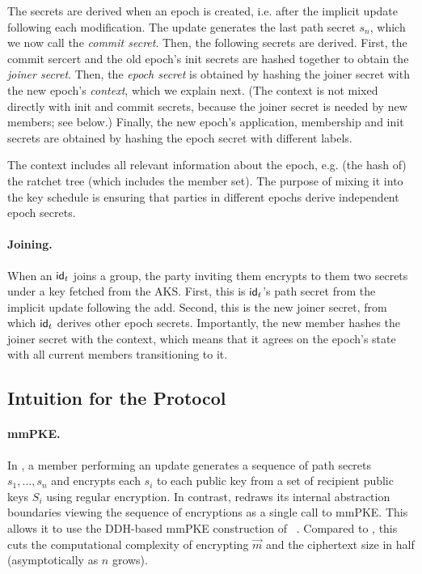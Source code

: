 The secrets are derived when an epoch is created, i.e. after the implicit update following each modification. The update
generates the last path secret $s_n$, which we now call the \emph{commit secret}. Then, the following secrets are
derived. First, the commit sercert and the old epoch's init secrets are hashed together to obtain the \emph{joiner
  secret}. Then, the \emph{epoch secret} is obtained by hashing the joiner secret with the new epoch's \emph{context}, which we explain next. (The context is not mixed directly with init and commit secrets, because the joiner secret is needed by new members; see below.) Finally, the new epoch's application, membership and init secrets are obtained by hashing the epoch secret with different labels.

The context includes all relevant information about the epoch, e.g. (the hash of) the ratchet tree (which includes the member set). The purpose of mixing it into the key schedule is ensuring that parties in different epochs derive independent epoch secrets.

\paragraph{Joining.}
When an ${\mathsf{id}}_t$ joins a group, the party inviting them encrypts to them two secrets under a key fetched from the AKS. First, this is ${\mathsf{id}}_t$'s path secret from the implicit update following the add. Second, this is the new joiner secret, from which ${\mathsf{id}}_t$ derives other epoch secrets.
Importantly, the new member hashes the joiner secret with the context, which means that it agrees on the epoch's state with all current members transitioning to it.

\subsection{Intuition for the \saik Protocol}\label{sec:intuition2}
\paragraph{mmPKE.}
In \protITK, a member performing an update generates a sequence of path secrets $s_1, \dots, s_n$ and encrypts each $s_i$ to each public key from a set of recipient public keys $S_i$ using regular encryption.
In contrast, \saik redraws its internal abstraction boundaries viewing the sequence of encryptions as a single call to mmPKE.
This allows it to use the DDH-based mmPKE construction of
~\cite{ASIACCS:PinPoeSch14}. Compared to \protITK, this cuts the
computational complexity of encrypting $\vec m$ and the ciphertext
size in half (asymptotically as $n$ grows).


